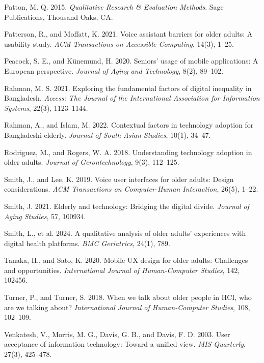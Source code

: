 \documentclass[acmlarge]{acmart}
\begin{document}
{\begin{thebibliography}{50}
Patton, M. Q. 2015. \textit{Qualitative Research \& Evaluation Methods}. Sage Publications, Thousand Oaks, CA.

Patterson, R., and Moffatt, K. 2021. Voice assistant barriers for older adults: A usability study. \textit{ACM Transactions on Accessible Computing}, 14(3), 1--25.

Peacock, S. E., and Künemund, H. 2020. Seniors’ usage of mobile applications: A European perspective. \textit{Journal of Aging and Technology}, 8(2), 89--102.

Rahman, M. S. 2021. Exploring the fundamental factors of digital inequality in Bangladesh. \textit{Access: The Journal of the International Association for Information Systems}, 22(3), 1123--1144.

Rahman, A., and Islam, M. 2022. Contextual factors in technology adoption for Bangladeshi elderly. \textit{Journal of South Asian Studies}, 10(1), 34--47.

Rodriguez, M., and Rogers, W. A. 2018. Understanding technology adoption in older adults. \textit{Journal of Gerontechnology}, 9(3), 112--125.

Smith, J., and Lee, K. 2019. Voice user interfaces for older adults: Design considerations. \textit{ACM Transactions on Computer-Human Interaction}, 26(5), 1--22.

Smith, J. 2021. Elderly and technology: Bridging the digital divide. \textit{Journal of Aging Studies}, 57, 100934.

Smith, L., et al. 2024. A qualitative analysis of older adults' experiences with digital health platforms. \textit{BMC Geriatrics}, 24(1), 789.

Tanaka, H., and Sato, K. 2020. Mobile UX design for older adults: Challenges and opportunities. \textit{International Journal of Human-Computer Studies}, 142, 102456.

Turner, P., and Turner, S. 2018. When we talk about older people in HCI, who are we talking about? \textit{International Journal of Human-Computer Studies}, 108, 102--109.

Venkatesh, V., Morris, M. G., Davis, G. B., and Davis, F. D. 2003. User acceptance of information technology: Toward a unified view. \textit{MIS Quarterly}, 27(3), 425--478.


\end{thebibliography}}
\end{document}

